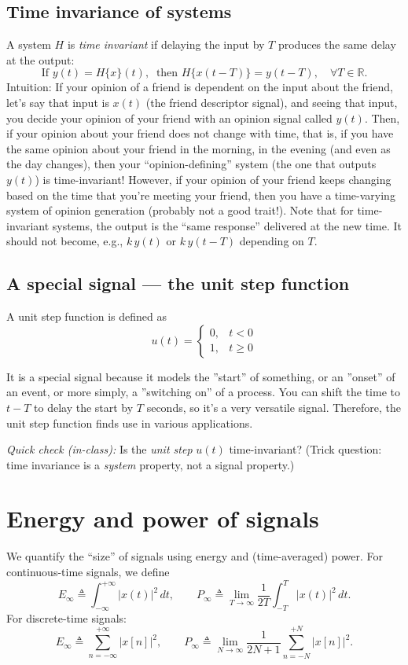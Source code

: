\documentclass{ee102_notes}
\begin{document}
\subsection{Time invariance of systems}
A system $H$ is \emph{time invariant} if delaying the input by $T$ produces the same delay at the output:
\[
\text{If }y(t)=H\{x\}(t),\ \text{ then }H\{x(t-T)\}=y(t-T),\quad\forall T\in\mathbb{R}.
\]
Intuition: If your opinion of a friend is dependent on the input about the friend, let's say that input is $x(t)$ (the friend descriptor signal), and seeing that input, you decide your opinion of your friend with an opinion signal called $y(t)$. Then, if your opinion about your friend does not change with time, that is, if you have the same opinion about your friend in the morning, in the evening (and even as the day changes), then your ``opinion-defining'' system (the one that outputs $y(t)$) is time-invariant! However, if your opinion of your friend keeps changing based on the time that you're meeting your friend, then you have a time-varying system of opinion generation (probably not a good trait!). Note that for time-invariant systems, the output is the ``same response'' delivered at the new time. It should not become, e.g., $k\,y(t)$ or $k\,y(t-T)$ depending on $T$.

\subsection{A special signal --- the unit step function}
A unit step function is defined as
\[
u(t) = \begin{cases}
0, & t < 0 \\
1, & t \geq 0
\end{cases}
\]

It is a special signal because it models the ''start'' of something, or an ''onset'' of an event, or more simply, a ''switching on'' of a process. You can shift the time to $t - T$ to delay the start by $T$ seconds, so it's a very versatile signal. Therefore, the unit step function finds use in various applications. 

\textit{Quick check (in-class):} Is the \emph{unit step} $u(t)$ time-invariant? (Trick question: time invariance is a \emph{system} property, not a signal property.)

\section{Energy and power of signals}
We quantify the ``size'' of signals using energy and (time-averaged) power.
For continuous-time signals, we define
\[
E_{\infty} \triangleq \int_{-\infty}^{+\infty}\! |x(t)|^{2}\,dt,\qquad
P_{\infty} \triangleq \lim_{T\to\infty} \frac{1}{2T}\int_{-T}^{T}\! |x(t)|^{2}\,dt.
\]
For discrete-time signals:
\[
E_{\infty} \triangleq \sum_{n=-\infty}^{+\infty} |x[n]|^{2},\qquad
P_{\infty} \triangleq \lim_{N\to\infty} \frac{1}{2N+1}\sum_{n=-N}^{+N} |x[n]|^{2}.
\]
\end{document}
